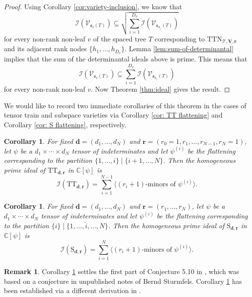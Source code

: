 \documentclass[12pt]{article}
\newtheorem{corollary}[theorem]{Corollary}
\theoremstyle{definition}
\newtheorem{remark}[theorem]{Remark}
\numberwithin{theorem}{section}
\newcommand{\V}{\mathcal{V}}
\begin{document}
\begin{proof}
Using Corollary \ref{cor:variety-inclusion}, we know that 
\begin{equation*}
     \mathcal{I}(\V_{\mathfrak{s}_v(T)}) \subseteq \sqrt{\sum_{i=1}^{D_v} \mathcal{I}(\V_{\mathfrak{s}_{h_i}(T)})}
\end{equation*}
for every non-rank non-leaf $v$ of the spaced tree $T$
corresponding to $\mathrm{TTN}_{\mathscr{T}, \mathbf{V}, \mathbf{r}}$ and its adjacent rank nodes $\{h_1, ..., h_{D_v}\}$.
Lemma \ref{lem:sum-of-determinantal} implies that
the sum of the determinantal ideals above is prime. This means that 
\begin{equation*}
     \mathcal{I}(\V_{\mathfrak{s}_v(T)}) \subseteq \sum_{i=1}^{D_v} \mathcal{I}(\V_{\mathfrak{s}_{h_i}(T)})
\end{equation*}
for every non-rank non-leaf $v$. Now Theorem \ref{thm:ideal} gives the result. 
\end{proof}

We would like to record two immediate corollaries of this theorem in the cases of tensor train and subspace varieties via Corollary \ref{cor: TT flattening} and Corollary \ref{cor: S flattening}, respectively.
\begin{corollary} \label{cor: main-TT}
For fixed $\mathbf{d}=(d_1, \ldots, d_N)$ and $\mathbf{r}=(r_0=1, r_1, \ldots, r_{N-1}, r_N=1)$, let $\psi$ be a $d_1 \times \cdots \times d_N$ tensor of indeterminates and let $\psi^{(i)}$ be the flattening corresponding to the partition $\{1,\ldots, i\} \mid \{i+1, \ldots, N\}$. Then the homogeneous prime ideal of $\mathrm{TT}_{\mathbf{d}, \mathbf{r}}$ in $\mathbb{C}[\psi]$ is
\[
\mathcal I(\mathrm{TT}_{\mathbf{d}, \mathbf{r}})
= \sum_{i=1}^{N-1} \Big\langle (r_i + 1)\textrm{-minors of }\psi^{(i)} \Big\rangle.
\]    
\end{corollary}
\begin{corollary} \label{cor: main-subspace}
For fixed $\mathbf{d}=(d_1, \ldots, d_N)$ and $\mathbf{r} = (r_1, \ldots, r_N)$, let $\psi$ be a $d_1 \times \cdots \times d_N$ tensor of indeterminates and let $\psi^{(i)}$ be the flattening corresponding to the partition $\{i\} \mid \{1, \ldots, \widehat{i}, \ldots, N\}$.
 Then the homogeneous prime ideal of $\mathrm{S}_{\mathbf{d}, \mathbf{r}}$ in $\mathbb{C}[\psi]$ is
\[
\mathcal I(\mathrm{S}_{\mathbf{d}, \mathbf{r}})
= \sum_{i=1}^{N} \Big\langle (r_i + 1)\textrm{-minors of }\psi^{(i)} \Big\rangle.
\]    
\end{corollary}
\begin{remark}
Corollary \ref{cor: main-TT} settles the first part of Conjecture 5.10 in \cite{BFHP25}, which was based on a conjecture in unpublished notes of Bernd Sturmfels. Corollary \ref{cor: main-subspace} has been established via a different derivation in \cite{landsberg2007, oeding2016}. 
\end{remark}
\end{document}
